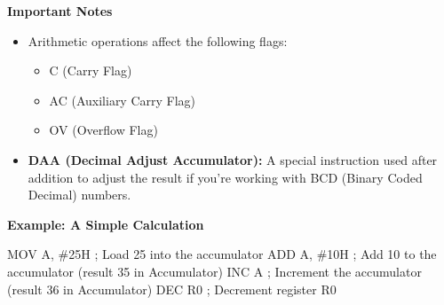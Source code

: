 \documentclass[
]{article}
\newenvironment{Shaded}{}{}
\newcommand{\NormalTok}[1]{#1}
\begin{document}
\textbf{Important Notes}

\begin{itemize}
\item
  Arithmetic operations affect the following flags:

  \begin{itemize}
  \item
    C (Carry Flag)
  \item
    AC (Auxiliary Carry Flag)
  \item
    OV (Overflow Flag)
  \end{itemize}
\item
  \textbf{DAA (Decimal Adjust Accumulator):} A special instruction used
  after addition to adjust the result if you're working with BCD (Binary
  Coded Decimal) numbers.
\end{itemize}

\textbf{Example: A Simple Calculation}

\begin{Shaded}
\begin{Highlighting}[]
\NormalTok{MOV A, \#25H   ; Load 25 into the accumulator}
\NormalTok{ADD A, \#10H   ; Add 10 to the accumulator (result 35 in Accumulator)}
\NormalTok{INC A         ; Increment the accumulator (result 36 in Accumulator)}
\NormalTok{DEC R0        ; Decrement register R0}
\end{Highlighting}
\end{Shaded}
\end{document}
